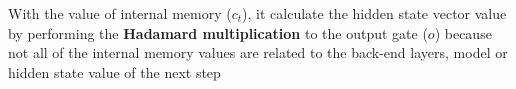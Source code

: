 With the value of internal memory ($c_{t}$), it calculate the hidden state vector value by performing the \textbf{Hadamard multiplication} to the output gate ($o$) because not all of the internal memory values are related to the back-end layers, model or hidden state value of the next step



